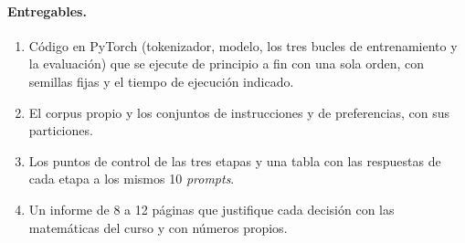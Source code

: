 \begin{figure}[h]
\centering
{}
\par{}
\end{figure}

\paragraph{Entregables.}
\begin{enumerate}[label=\arabic*.]
  \item Código en PyTorch (tokenizador, modelo, los tres bucles de entrenamiento y la evaluación) que se ejecute de principio a fin con una sola orden, con semillas fijas y el tiempo de ejecución indicado.
  \item El corpus propio y los conjuntos de instrucciones y de preferencias, con sus particiones.
  \item Los puntos de control de las tres etapas y una tabla con las respuestas de cada etapa a los mismos 10 \emph{prompts}.
  \item Un informe de 8 a 12 páginas que justifique cada decisión con las matemáticas del curso y con números propios.
\end{enumerate}

